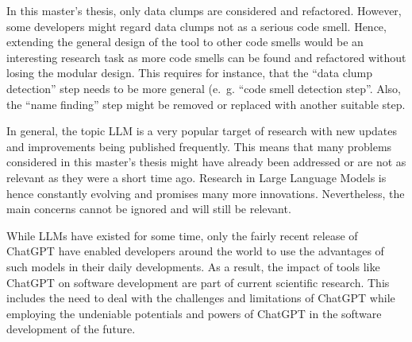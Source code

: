 
In this master's thesis, only data clumps are considered and refactored. However, some developers might regard data clumps not as a serious code smell. Hence, extending the general design of the tool to other code smells would be an interesting research task as more code smells can be found and refactored without losing the modular design. This requires for instance, that the \enquote{data clump detection} step needs to be more general (e.~g. \enquote{code smell detection step}. Also, the \enquote{name finding} step might be removed or replaced with another suitable step. 

 

In general, the topic \ac{LLM} is a very popular target of research with new updates and improvements being published frequently. This means that many problems considered in this master's thesis might have already been addressed or are not as relevant as they were a short time ago. Research in Large Language Models is hence constantly evolving and promises many more innovations. Nevertheless, the main concerns cannot be ignored and will still be relevant.

While \acp{LLM}  have existed for some time, only the fairly recent release of ChatGPT have enabled developers around the world to use the advantages of such models in their daily developments. As a result, the impact of tools like ChatGPT on software development are part of current scientific research. This includes the need to deal with the challenges and limitations of ChatGPT while employing the undeniable potentials and powers of ChatGPT in the software development of the future. 



